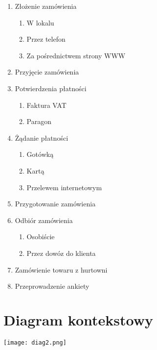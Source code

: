\documentclass[a4paper,12pt]{article}
\begin{document}
    \begin{enumerate}
        \item Złożenie zamówienia
        \begin{enumerate}
            \item W lokalu
            \item Przez telefon
            \item Za pośrednictwem strony WWW
        \end{enumerate}
        \item Przyjęcie zamówienia
        \item Potwierdzenia płatności
        \begin{enumerate}
            \item Faktura VAT
            \item Paragon
        \end{enumerate}
        \item Żądanie płatności
        \begin{enumerate}
            \item Gotówką
            \item Kartą
            \item Przelewem internetowym
        \end{enumerate}
        \item Przygotowanie zamówienia
        \item Odbiór zamówienia
        \begin{enumerate}
            \item Osobiście
            \item Przez dowóz do klienta
        \end{enumerate}
        \item Zamówienie towaru z hurtowni
        \item Przeprowadzenie ankiety
    \end{enumerate}

    \newpage
	\section{Diagram kontekstowy}
	\texttt{[image: diag2.png]}
\end{document}
